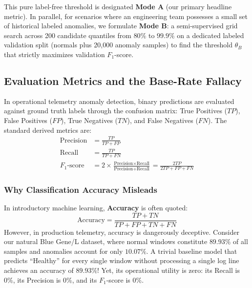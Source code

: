 This pure label-free threshold is designated \textbf{Mode A} (our primary headline metric). In parallel, for scenarios where an engineering team possesses a small set of historical labeled anomalies, we formulate \textbf{Mode B}: a semi-supervised grid search across 200 candidate quantiles from $80\%$ to $99.9\%$ on a dedicated labeled validation split (normals plus 20,000 anomaly samples) to find the threshold $\theta_B$ that strictly maximizes validation $F_1$-score.

\subsection{Evaluation Metrics and the Base-Rate Fallacy}
\label{subsec:eval_metrics_fallacy}
In operational telemetry anomaly detection, binary predictions are evaluated against ground truth labels through the confusion matrix: True Positives ($TP$), False Positives ($FP$), True Negatives ($TN$), and False Negatives ($FN$). The standard derived metrics are:
\begin{align}
    \text{Precision} &= \frac{TP}{TP + FP} \\
    \text{Recall} &= \frac{TP}{TP + FN} \\
    F_1\text{-score} &= 2 \times \frac{\text{Precision} \times \text{Recall}}{\text{Precision} + \text{Recall}} = \frac{2 TP}{2 TP + FP + FN}
\end{align}

\subsubsection{Why Classification Accuracy Misleads}
In introductory machine learning, \textbf{Accuracy} is often quoted:
\begin{equation}
    \text{Accuracy} = \frac{TP + TN}{TP + FP + TN + FN}
\end{equation}
However, in production telemetry, accuracy is dangerously deceptive. Consider our natural Blue Gene/L dataset, where normal windows constitute $89.93\%$ of all samples and anomalies account for only $10.07\%$. A trivial baseline model that predicts ``Healthy'' for every single window without processing a single log line achieves an accuracy of $\mathbf{89.93\%}$! Yet, its operational utility is zero: its Recall is $0\%$, its Precision is $0\%$, and its $F_1$-score is $0\%$.

